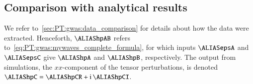\subsection{Comparison with analytical results}\label{sec:results:h11:comparison}
    We refer to~\cref{sec:PT:gwas:data_comparison} for details about how the data were extracted. Henceforth, $\hpAB$ refers to~\cref{eq:PT:gwas:mywaves_complete_formula}, for which inputs $\epsA$ and $\epsC$ give $\hpA$ and $\hpB$, respectively. The output from simulations, the $xx$-component of the tensor perturbations, is denoted $\hpC  =  \hpCR + \im\,  \hpCI$. %
